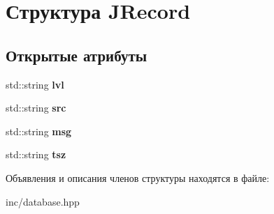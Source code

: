 \hypertarget{structJRecord}{}\section{Структура J\+Record}
\label{structJRecord}
\subsection*{Открытые атрибуты}
\begin{DoxyCompactItemize}
\item 
\mbox{\label{structJRecord_a9e2e8b47bd1581d5d4ca340a507889b4}} 
std\+::string {\bfseries lvl}
\item 
\mbox{\label{structJRecord_a0a5efa9a1ee6c1d077b1b9b78da2003c}} 
std\+::string {\bfseries src}
\item 
\mbox{\label{structJRecord_a7319fe65b4fe3f6c335488a0e7f968ab}} 
std\+::string {\bfseries msg}
\item 
\mbox{\label{structJRecord_a81a59cad266c146915e96fa353a7fe2c}} 
std\+::string {\bfseries tsz}
\end{DoxyCompactItemize}


Объявления и описания членов структуры находятся в файле\+:\begin{DoxyCompactItemize}
\item 
inc/database.\+hpp\end{DoxyCompactItemize}
